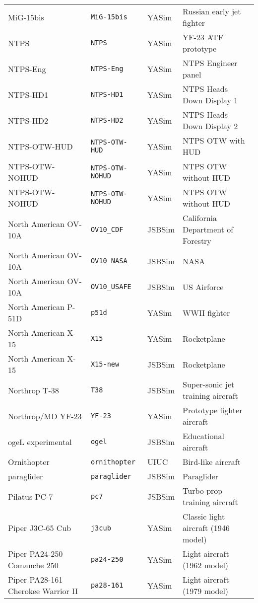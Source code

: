 \begin{tabular}{l|l|l|l}
   MiG-15bis        & \texttt{MiG-15bis}  & YASim  &  Russian early jet fighter\\
   NTPS             & \texttt{NTPS}  & YASim  &  YF-23 ATF prototype\\
   NTPS-Eng         & \texttt{NTPS-Eng}  & YASim  &  NTPS Engineer panel\\
   NTPS-HD1         & \texttt{NTPS-HD1}  & YASim  &  NTPS Heads Down Display 1\\
   NTPS-HD2         & \texttt{NTPS-HD2}  & YASim  &  NTPS Heads Down Display 2\\
   NTPS-OTW-HUD     & \texttt{NTPS-OTW-HUD}  & YASim  &  NTPS OTW with HUD\\
   NTPS-OTW-NOHUD   & \texttt{NTPS-OTW-NOHUD}  & YASim  &  NTPS OTW without HUD\\
   NTPS-OTW-NOHUD   & \texttt{NTPS-OTW-NOHUD}  & YASim  &  NTPS OTW without HUD\\
   North American OV-10A & \texttt{OV10\_CDF} & JSBSim & California Department of Forestry\\
   North American OV-10A & \texttt{OV10\_NASA} & JSBSim & NASA\\
   North American OV-10A & \texttt{OV10\_USAFE} & JSBSim & US Airforce\\
   North American P-51D & \texttt{p51d} & YASim & WWII fighter\\
   North American X-15 & \texttt{X15} & YASim & Rocketplane\\
   North American X-15 & \texttt{X15-new} & JSBSim & Rocketplane\\
   Northrop T-38 & \texttt{T38} & JSBSim & Super-sonic jet training aircraft\\
   Northrop/MD YF-23 & \texttt{YF-23} & YASim & Prototype fighter aircraft\\
   ogeL experimental & \texttt{ogel} & JSBSim & Educational aircraft\\
   Ornithopter & \texttt{ornithopter} & UIUC & Bird-like aircraft\\
   paraglider & \texttt{paraglider} & JSBSim & Paraglider\\
   Pilatus PC-7 & \texttt{pc7} & JSBSim & Turbo-prop training aircraft\\
   Piper J3C-65 Cub & \texttt{j3cub} & YASim & Classic light aircraft (1946 model)\\
   Piper PA24-250 Comanche 250 & \texttt{pa24-250} & YASim & Light aircraft (1962 model)\\
   Piper PA28-161 Cherokee Warrior II & \texttt{pa28-161} & YASim & Light aircraft (1979 model)\\

\end{tabular}

